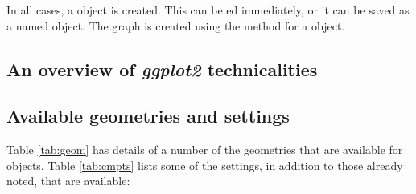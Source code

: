 In all cases, a  object is created. This can
be ed immediately, or it can be saved as a named object.
The graph is created using the  method for a
 object.

\subsection{An overview of {\em ggplot2} technicalities}




\subsection*{Available geometries and settings}

Table \ref{tab:geom} has details of a number of the geometries that
are available for  objects. Table \ref{tab:cmpts} lists
some of the settings, in addition to those already noted, that are
available:\\[-9pt]

